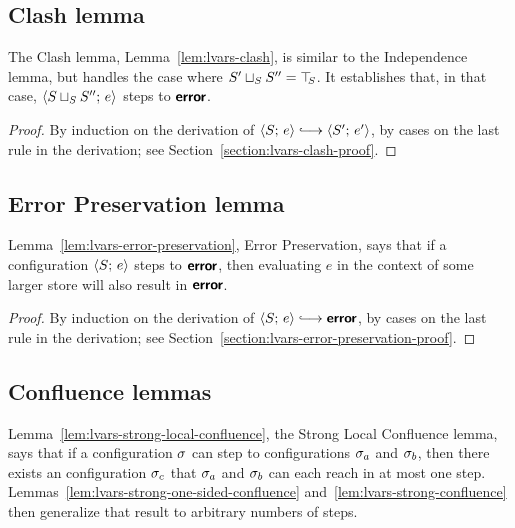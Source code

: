 \subsection{Clash lemma}

The Clash lemma, Lemma~\ref{lem:lvars-clash}, is similar to the
Independence lemma, but handles the case where $S' \sqcup_{S} S'' =
\top\hspace{-0.85mm}_{S}$.  It establishes that, in that case,
$\langle S \sqcup_{S} S'';\, e \rangle$ steps to $\textbf{\textsf{error}}$.


\LVarsLemClash
\begin{proof}
  By induction on the derivation of $\config{S}{e} \parstepsto
  \config{S'}{e'}$, by cases on the last rule in the derivation; see
  Section~\ref{section:lvars-clash-proof}.
\end{proof}

\subsection{Error Preservation lemma}

Lemma~\ref{lem:lvars-error-preservation}, Error Preservation, says
that if a configuration $\langle S;\, e \rangle$ steps to $\textbf{\textsf{error}}$, then
evaluating $e$ in the context of some larger store will also result in
$\textbf{\textsf{error}}$.


\LVarsLemErrorPreservation
\begin{proof}
  By induction on the derivation of $\config{S}{e} \parstepsto
  \error$, by cases on the last rule in the derivation; see
  Section~\ref{section:lvars-error-preservation-proof}.
\end{proof}

\subsection{Confluence lemmas}\label{subsection:lvars-confluence}

Lemma~\ref{lem:lvars-strong-local-confluence}, the Strong Local
Confluence lemma, says that if a configuration $\sigma$ can step to
configurations $\sigma_a$ and $\sigma_b$, then there exists an
configuration $\sigma_c$ that $\sigma_a$ and $\sigma_b$ can each reach in
at most one step.  Lemmas~\ref{lem:lvars-strong-one-sided-confluence}
and~\ref{lem:lvars-strong-confluence} then generalize that result to
arbitrary numbers of steps.

